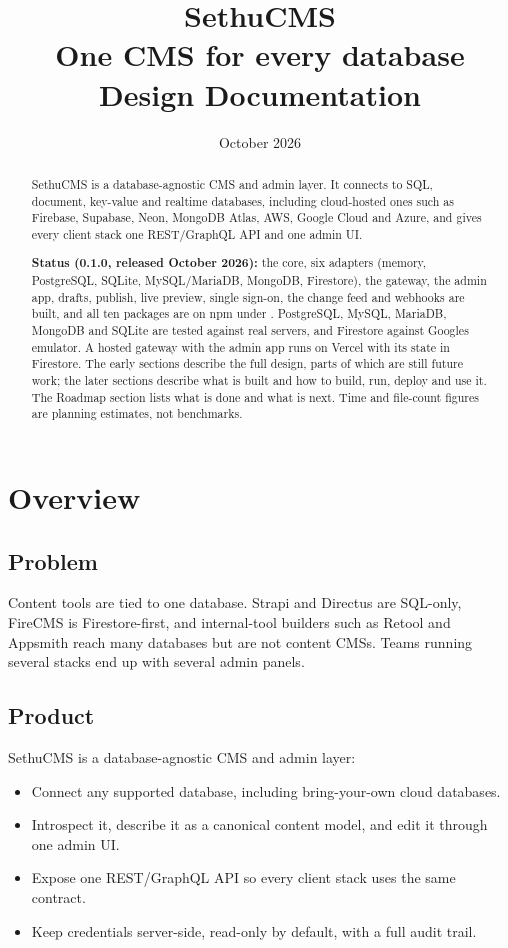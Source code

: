 \documentclass[11pt,a4paper]{article}
\title{\textbf{SethuCMS}\\[0.4em]\large One CMS for every database\\[1.2em]\normalsize Design Documentation}
\author{}
\date{October 2026}
\newcommand{\code}[1]{\IfSubStr{\detokenize{#1}}{ }{\texttt{\detokenize{#1}}}{\texttt{\expandafter\seqsplit\expandafter{\detokenize{#1}}}}}
\begin{document}
\maketitle
\thispagestyle{empty}

\begin{abstract}
\noindent SethuCMS is a database-agnostic CMS and admin layer. It connects to SQL, document, key-value and realtime databases, including cloud-hosted ones such as Firebase, Supabase, Neon, MongoDB Atlas, AWS, Google Cloud and Azure, and gives every client stack one REST/GraphQL API and one admin UI.

\medskip
\noindent\textbf{Status (0.1.0, released October 2026):} the core, six adapters (memory, PostgreSQL, SQLite, MySQL/MariaDB, MongoDB, Firestore), the gateway, the admin app, drafts, publish, live preview, single sign-on, the change feed and webhooks are built, and all ten packages are on npm under \code{@sethucms}. PostgreSQL, MySQL, MariaDB, MongoDB and SQLite are tested against real servers, and Firestore against Google\textquotesingle s emulator. A hosted gateway with the admin app runs on Vercel with its state in Firestore. The early sections describe the full design, parts of which are still future work; the later sections describe what is built and how to build, run, deploy and use it. The Roadmap section lists what is done and what is next. Time and file-count figures are planning estimates, not benchmarks.
\end{abstract}

\tableofcontents
\newpage

\section{Overview}

\subsection{Problem}
Content tools are tied to one database. Strapi and Directus are SQL-only, FireCMS is Firestore-first, and internal-tool builders such as Retool and Appsmith reach many databases but are not content CMSs. Teams running several stacks end up with several admin panels.

\subsection{Product}
SethuCMS is a database-agnostic CMS and admin layer:
\begin{itemize}
  \item Connect any supported database, including bring-your-own cloud databases.
  \item Introspect it, describe it as a canonical content model, and edit it through one admin UI.
  \item Expose one REST/GraphQL API so every client stack uses the same contract.
  \item Keep credentials server-side, read-only by default, with a full audit trail.
\end{itemize}
\end{document}
